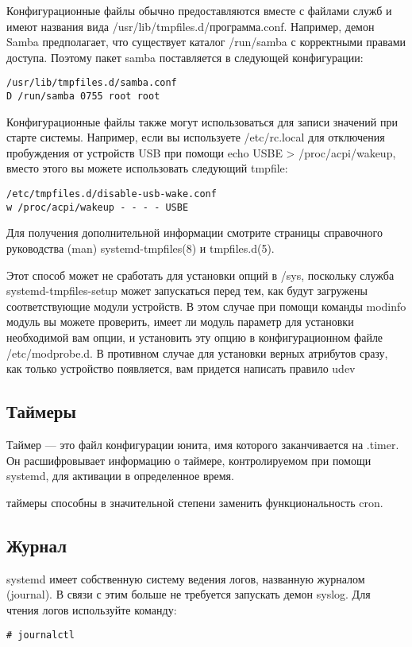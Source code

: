 \documentclass[a4paper,10pt,twoside]{article}
\begin{document}
Конфигурационные файлы обычно предоставляются вместе с файлами служб и имеют названия вида /usr/lib/tmpfiles.d/программа.conf. Например, демон Samba предполагает, что существует каталог /run/samba с корректными правами доступа. Поэтому пакет samba поставляется в следующей конфигурации:

\begin{verbatim}
/usr/lib/tmpfiles.d/samba.conf
D /run/samba 0755 root root
\end{verbatim}

Конфигурационные файлы также могут использоваться для записи значений при старте системы. Например, если вы используете /etc/rc.local для отключения пробуждения от устройств USB при помощи echo USBE > /proc/acpi/wakeup, вместо этого вы можете использовать следующий tmpfile:
\begin{verbatim}
/etc/tmpfiles.d/disable-usb-wake.conf
w /proc/acpi/wakeup - - - - USBE
\end{verbatim} 

Для получения дополнительной информации смотрите страницы справочного руководства (man) systemd-tmpfiles(8) и tmpfiles.d(5).

 Этот способ может не сработать для установки опций в /sys, поскольку служба systemd-tmpfiles-setup может запускаться перед тем, как будут загружены соответствующие модули устройств. В этом случае при помощи команды modinfo модуль вы можете проверить, имеет ли модуль параметр для установки необходимой вам опции, и установить эту опцию в конфигурационном файле /etc/modprobe.d. В противном случае для установки верных атрибутов сразу, как только устройство появляется, вам придется написать правило udev

\subsection{Таймеры}
Таймер — это файл конфигурации юнита, имя которого заканчивается на .timer. Он расшифровывает информацию о таймере, контролируемом при помощи systemd, для активации в определенное время. 

 таймеры способны в значительной степени заменить функциональность cron.

\subsection{Журнал}
systemd имеет собственную систему ведения логов, названную журналом (journal). В связи с этим больше не требуется запускать демон syslog. Для чтения логов используйте команду:
\begin{verbatim}
# journalctl
\end{verbatim} 
\end{document}
